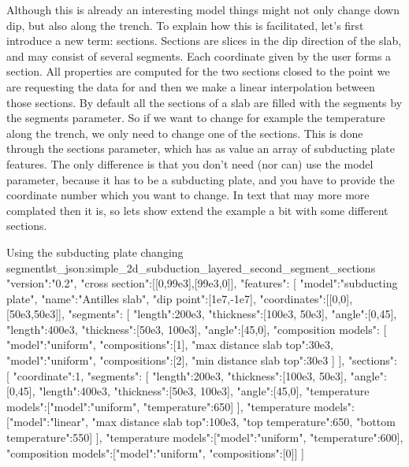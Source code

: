 \documentclass{book}
\begin{document}
Although this is already an interesting model things might not only change down dip, but also along the trench. To explain how this is facilitated, let's first introduce a new term: sections. Sections are slices in the dip direction of the slab, and may consist of several segments. Each coordinate given by the user forms a section. All properties are computed for the two sections closed to the point we are requesting the data for and then we make a linear interpolation between those sections. By default all the sections of a slab are filled with the segments by the segments parameter. So if we want to change for example the temperature along the trench, we only need to change one of the sections. This is done through the sections parameter, which has as value an array of subducting plate features. The only difference is that you don't need (nor can) use the model parameter, because it has to be a subducting plate, and you have to provide the coordinate number which you want to change. In text that may more more complated then it is, so lets show extend the example a bit with some different sections.

\begin{javascriptcode}{Using the subducting plate changing segment}{lst_json:simple_2d_subduction_layered_second_segment_sections}
{
  "version":"0.2",
  "cross section":[[0,99e3],[99e3,0]],
  "features":
  [
     {
       "model":"subducting plate", "name":"Antilles slab", "dip point":[1e7,-1e7],
       "coordinates":[[0,0],[50e3,50e3]],
       "segments":
       [
         {"length":200e3, "thickness":[100e3, 50e3], "angle":[0,45]},
         {
           "length":400e3, "thickness":[50e3, 100e3], "angle":[45,0],
           "composition models":
           [
             {"model":"uniform", "compositions":[1], "max distance slab top":30e3},
             {"model":"uniform", "compositions":[2], "min distance slab top":30e3}
           ]
         }
       ],
       "sections":
       [
         {
           "coordinate":1,
           "segments":
            [
              {"length":200e3, "thickness":[100e3, 50e3], "angle":[0,45]},
              {"length":400e3, "thickness":[50e3, 100e3], "angle":[45,0], 
                "temperature models":[{"model":"uniform", "temperature":650}]}
            ],
            "temperature models":[{"model":"linear", "max distance slab top":100e3, 
                                     "top temperature":650, "bottom temperature":550}]
         }
       ],
       "temperature models":[{"model":"uniform", "temperature":600}],
       "composition models":[{"model":"uniform", "compositions":[0]}]
    }
  ]
}
\end{javascriptcode}
\end{document}
